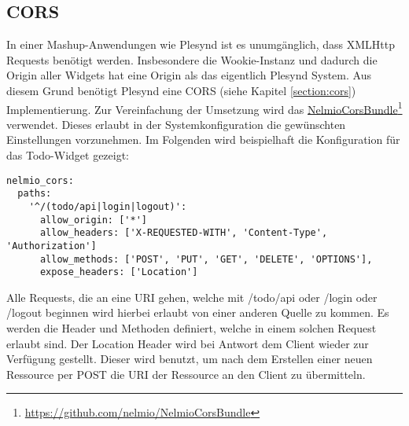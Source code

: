 \subsection{CORS}\label{section:cors_implementierung}
In einer Mashup-Anwendungen wie Plesynd ist es unumgänglich, dass XMLHttp Requests benötigt werden. Insbesondere die Wookie-Instanz und dadurch die Origin aller Widgets hat eine Origin als das eigentlich Plesynd System. Aus diesem Grund benötigt Plesynd eine CORS (siehe Kapitel \ref{section:cors}) Implementierung. Zur Vereinfachung der Umsetzung wird das \href{https://github.com/nelmio/NelmioCorsBundle}{NelmioCorsBundle}\footnote{\url{https://github.com/nelmio/NelmioCorsBundle}} verwendet. Dieses erlaubt in der Systemkonfiguration die gewünschten Einstellungen vorzunehmen. Im Folgenden wird beispielhaft die Konfiguration für das Todo-Widget gezeigt: 
\begin{lstlisting}
nelmio_cors:
  paths:
    '^/(todo/api|login|logout)':
      allow_origin: ['*']
      allow_headers: ['X-REQUESTED-WITH', 'Content-Type', 'Authorization']
      allow_methods: ['POST', 'PUT', 'GET', 'DELETE', 'OPTIONS'],
      expose_headers: ['Location']
\end{lstlisting}
Alle Requests, die an eine URI gehen, welche mit /todo/api oder /login oder /logout beginnen wird hierbei erlaubt von einer anderen Quelle zu kommen. Es werden die Header und Methoden definiert, welche in einem solchen Request erlaubt sind. Der Location Header wird bei Antwort dem Client wieder zur Verfügung gestellt. Dieser wird benutzt, um nach dem Erstellen einer neuen Ressource per POST die URI der Ressource an den Client zu übermitteln. 

